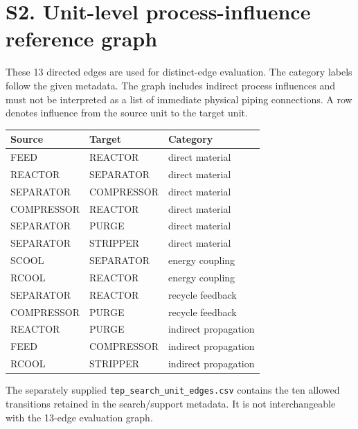 \documentclass[11pt,a4paper]{article}
\begin{document}
\section*{S2. Unit-level process-influence reference graph}
These 13 directed edges are used for distinct-edge evaluation. The category labels follow the given metadata. The graph includes indirect process influences and must not be interpreted as a list of immediate physical piping connections. A row denotes influence from the source unit to the target unit.
\begin{center}\small
\begin{tabular}{lll}\toprule Source & Target & Category \\\midrule
FEED & REACTOR & direct material \\
REACTOR & SEPARATOR & direct material \\
SEPARATOR & COMPRESSOR & direct material \\
COMPRESSOR & REACTOR & direct material \\
SEPARATOR & PURGE & direct material \\
SEPARATOR & STRIPPER & direct material \\
SCOOL & SEPARATOR & energy coupling \\
RCOOL & REACTOR & energy coupling \\
SEPARATOR & REACTOR & recycle feedback \\
COMPRESSOR & PURGE & recycle feedback \\
REACTOR & PURGE & indirect propagation \\
FEED & COMPRESSOR & indirect propagation \\
RCOOL & STRIPPER & indirect propagation \\
\bottomrule\end{tabular}\end{center}
The separately supplied \texttt{tep\_search\_unit\_edges.csv} contains the ten allowed transitions retained in the search/support metadata. It is not interchangeable with the 13-edge evaluation graph.
\clearpage
\end{document}
